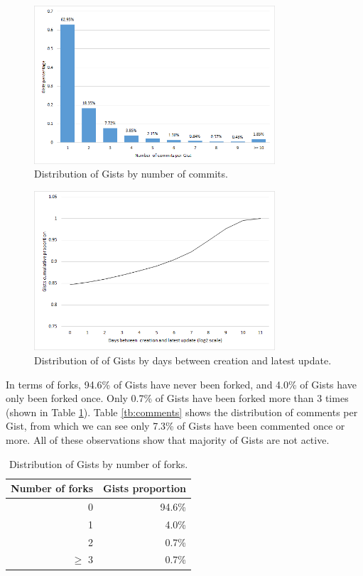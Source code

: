 \begin{figure}[!htb]
	\centering
	\includegraphics[width=0.8\textwidth]{figures/commits.png}
	\caption{Distribution of Gists by number of commits.}
	\label{fig:commits}
\end{figure}
\begin{figure}[!htb]
	\centering
	\includegraphics[width=0.8\textwidth]{figures/date_diff.png}
	\caption{Distribution of of Gists by days between creation and latest update.}
	\label{fig:days}
\end{figure}

In terms of forks, 94.6\% of Gists have never been forked, and 4.0\% of Gists have only been forked once. Only 0.7\% of Gists have been forked more than 3 times (shown in Table \ref{tb:forks}). Table \ref{tb:comments} shows the distribution of comments per Gist, from which we can see only 7.3\% of Gists have been commented once or more. All of these observations show that majority of Gists are not active.

\begin{table}[!htb]
 \begin{center}
 \begin{tabular}{@{}rr} 
    \textbf{Number of forks} &   \textbf{Gists proportion}\\ \hline
    0 &   94.6\% \\ 
    1 &   4.0\% \\ 
    2 &   0.7\% \\ 
    $\geq$ 3 &   0.7\%\\ \hline
 \end{tabular}
 \end{center}
 \caption{Distribution of Gists by number of forks.}
 \label{tb:forks}
\end{table}

